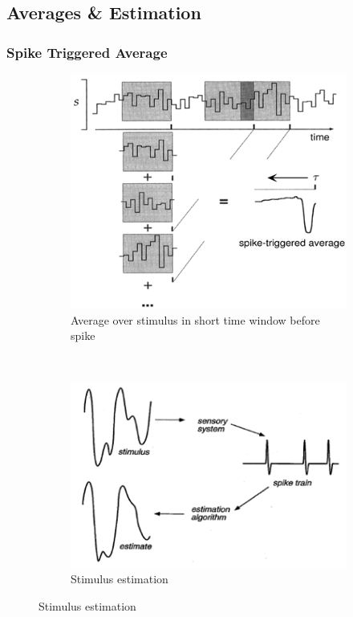 \documentclass[english,11pt]{article}
\begin{document}
\subsection{Averages \& Estimation}

\subsubsection {Spike Triggered Average}
\begin{figure}[H]
        \centering
        \begin{subfigure}[b]{0.5\textwidth}
                \centering
				\includegraphics[width=\textwidth]{spike-triggered-average.png}
				\caption{Average over stimulus in short time window before spike}
        \end{subfigure}%
        ~
        \begin{subfigure}[b]{0.5\textwidth}
                \centering
				\includegraphics[width=\textwidth]{stimulus-estimation.png}
				\caption{Stimulus estimation}
        \end{subfigure}
\end{figure}
\end{document}
